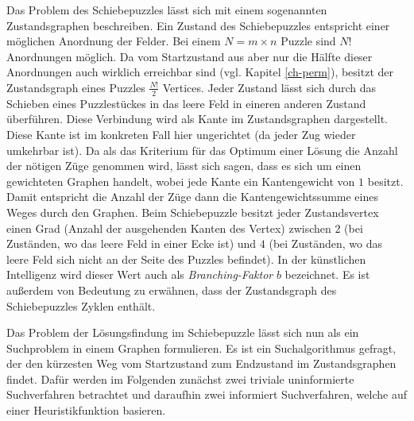 \documentclass{whswinvcbook}
\begin{document}
Das Problem des Schiebepuzzles lässt sich mit einem sogenannten Zustandsgraphen beschreiben. Ein Zustand des Schiebepuzzles entspricht einer möglichen Anordnung der Felder. Bei einem $N=m\times n$ Puzzle sind $N!$ Anordnungen möglich. Da vom Startzustand aus aber nur die Hälfte dieser Anordnungen auch wirklich erreichbar sind (vgl. Kapitel \ref{ch-perm}), besitzt der Zustandsgraph eines Puzzles $\frac{N!}{2}$ Vertices. Jeder Zustand lässt sich durch das Schieben eines Puzzlestückes in das leere Feld in eineren anderen Zustand überführen. Diese Verbindung wird als Kante im Zustandsgraphen dargestellt. Diese Kante ist im konkreten Fall hier ungerichtet (da jeder Zug wieder umkehrbar ist). Da als das Kriterium für das Optimum einer Lösung die Anzahl der nötigen Züge genommen wird, lässt sich sagen, dass es sich um einen gewichteten Graphen handelt, wobei jede Kante ein Kantengewicht von $1$ besitzt. Damit entspricht die Anzahl der Züge dann die Kantengewichtssumme eines Weges durch den Graphen. Beim Schiebepuzzle besitzt jeder Zustandsvertex einen Grad (Anzahl der ausgehenden Kanten des Vertex) zwischen $2$ (bei Zuständen, wo das leere Feld in einer Ecke ist) und $4$ (bei Zuständen, wo das leere Feld sich nicht an der Seite des Puzzles befindet). In der künstlichen Intelligenz wird dieser Wert auch als \textit{Branching-Faktor} $b$ bezeichnet. Es ist außerdem von Bedeutung zu erwähnen, dass der Zustandsgraph des Schiebepuzzles Zyklen enthält.

Das Problem der Lösungsfindung im Schiebepuzzle lässt sich nun als ein Suchproblem in einem Graphen formulieren. Es ist ein Suchalgorithmus gefragt, der den kürzesten Weg vom Startzustand zum Endzustand im Zustandsgraphen findet. Dafür werden im Folgenden zunächst zwei triviale uninformierte Suchverfahren betrachtet und daraufhin zwei informiert Suchverfahren, welche auf einer Heuristikfunktion basieren.
\end{document}
